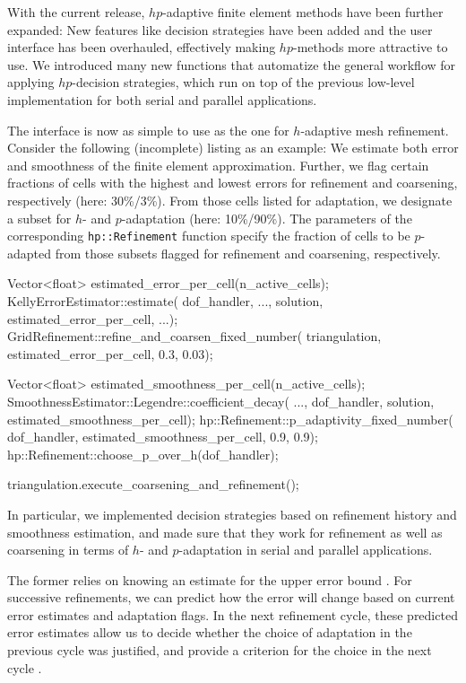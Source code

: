 \documentclass{ansarticle-preprint}
\begin{document}
With the current release, $hp$-adaptive finite element methods have been further
expanded: New features like decision strategies have been added and the user interface
has been overhauled, effectively making $hp$-methods more attractive to use. We introduced
many new functions that automatize the general workflow for applying $hp$-decision
strategies, which run on top of the previous low-level implementation for both serial
and parallel applications.

The interface is now as simple to use as the one for $h$-adaptive mesh refinement.
Consider the following (incomplete) listing as an example: We estimate both error and
smoothness of the finite element approximation. Further, we flag certain fractions of
cells with the highest and lowest errors for refinement and coarsening, respectively
(here: 30\%/3\%). From those cells listed for adaptation, we designate a subset
for $h$- and $p$-adaptation (here: 10\%/90\%). The parameters of the corresponding
\texttt{hp::Refinement} function specify the fraction of cells to be $p$-adapted from
those subsets flagged for refinement and coarsening, respectively.
\begin{c++}
Vector<float> estimated_error_per_cell(n_active_cells);
KellyErrorEstimator::estimate(
  dof_handler, ..., solution, estimated_error_per_cell, ...);
GridRefinement::refine_and_coarsen_fixed_number(
  triangulation, estimated_error_per_cell, 0.3, 0.03);

Vector<float> estimated_smoothness_per_cell(n_active_cells);
SmoothnessEstimator::Legendre::coefficient_decay(
  ..., dof_handler, solution, estimated_smoothness_per_cell);
hp::Refinement::p_adaptivity_fixed_number(
  dof_handler, estimated_smoothness_per_cell, 0.9, 0.9);
hp::Refinement::choose_p_over_h(dof_handler);

triangulation.execute_coarsening_and_refinement();
\end{c++}

In particular, we implemented decision strategies based on refinement history and
smoothness estimation, and made sure that they work for refinement as well as
coarsening in terms of $h$- and $p$-adaptation in serial and parallel applications.

The former relies on knowing an estimate for the upper error bound \cite[Thm.~3.4]{BabuskaSuri1990}.
For successive refinements, we can predict how the error will change based on
current error estimates and adaptation flags. In the next refinement cycle, these
predicted error estimates allow us to decide whether the choice of adaptation in
the previous cycle was justified, and provide a criterion for the choice in the next
cycle \cite{MelenkWohlmuth2001}.
\end{document}

